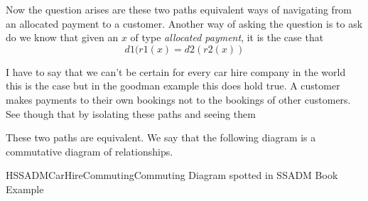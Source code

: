 Now the question arises are these two paths equivalent ways of navigating from an allocated payment to a customer.
Another way of asking the question is to ask do we know that given an $x$ of type \textit{allocated  payment}, it is the case that
 \begin{equation*}
d1(r1(x) = d2(r2(x))
\end{equation*}

I have to say that we can't be certain for every car hire company in the world this is the case but in the goodman example this does hold true.
A customer makes payments to their own bookings not to the bookings of other customers. See though that by isolating these paths and seeing them 



These two paths are equivalent. We say that the following diagram is a commutative diagram of relationships. 
\begin{erboxedFigure}{H}{SSADMCarHireCommuting}{Commuting Diagram spotted in SSADM Book Example}

\end{erboxedFigure}

